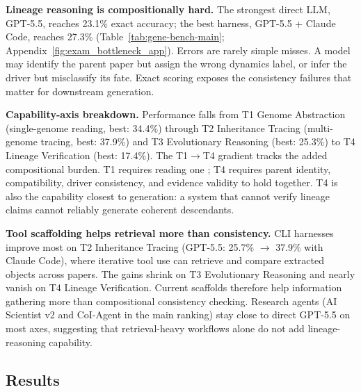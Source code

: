 

\textbf{Lineage reasoning is compositionally hard.}
The strongest direct LLM, GPT-5.5, reaches 23.1\% exact accuracy; the best harness, GPT-5.5 + Claude Code, reaches 27.3\% (Table~\ref{tab:gene-bench-main}; Appendix~\ref{fig:exam_bottleneck_app}). Errors are rarely simple misses. A model may identify the parent paper but assign the wrong dynamics label, or infer the driver \genome{} but misclassify its fate. Exact scoring exposes the consistency failures that matter for downstream generation.

\textbf{Capability-axis breakdown.}
Performance falls from T1 Genome Abstraction (single-genome reading, best: 34.4\%) through T2 Inheritance Tracing (multi-genome tracing, best: 37.9\%) and T3 Evolutionary Reasoning (best: 25.3\%) to T4 Lineage Verification (best: 17.4\%). The T1$\to$T4 gradient tracks the added compositional burden. T1 requires reading one \genome{}; T4 requires parent identity, \genome{} compatibility, driver consistency, and evidence validity to hold together. T4 is also the capability closest to generation: a system that cannot verify lineage claims cannot reliably generate coherent descendants.

\textbf{Tool scaffolding helps retrieval more than consistency.}
CLI harnesses improve most on T2 Inheritance Tracing (GPT-5.5: 25.7\% $\rightarrow$ 37.9\% with Claude Code), where iterative tool use can retrieve and compare extracted \genome{} objects across papers. The gains shrink on T3 Evolutionary Reasoning and nearly vanish on T4 Lineage Verification. Current scaffolds therefore help information gathering more than compositional consistency checking. Research agents (AI Scientist v2 and CoI-Agent in the main ranking) stay close to direct GPT-5.5 on most axes, suggesting that retrieval-heavy workflows alone do not add lineage-reasoning capability.

\FloatBarrier

\subsection{\genearena{} Results}

